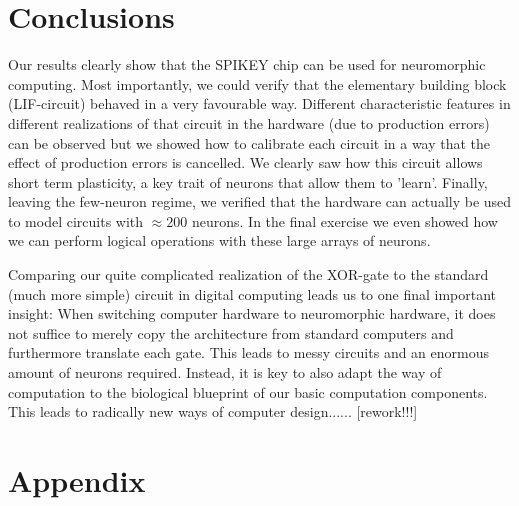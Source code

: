 \documentclass[a4paper,twocolumn]{article}
\begin{document}
\section{Conclusions}
Our results clearly show that the SPIKEY chip can be used for neuromorphic
computing. Most importantly,  we could verify that the elementary building
block (LIF-circuit) behaved in a very favourable way. Different characteristic
features in different realizations of that circuit in the hardware (due to production errors) can be observed but we showed how to calibrate each circuit
in a way that the effect of production errors is cancelled.  We clearly saw
how this circuit allows short term plasticity,  a key trait of neurons that
allow them to 'learn'.  Finally,  leaving the few-neuron regime,  we verified
that the hardware can actually be used to model circuits with $\approx 200$
neurons.  In the final exercise we even showed how we can perform logical
operations with these large arrays of neurons.\par
Comparing our quite complicated realization of the XOR-gate to the standard
(much more simple) circuit in digital computing leads us to one final important
insight: When switching computer hardware to neuromorphic hardware, it does
not suffice to merely copy the architecture from standard computers and
furthermore translate each gate.  This leads to messy circuits and an enormous
amount of neurons required.  Instead,  it is key to also adapt the way of
computation to the biological blueprint of our basic computation components.
This leads to radically new ways of computer design...... [rework!!!]





\section{Appendix}
\end{document}
